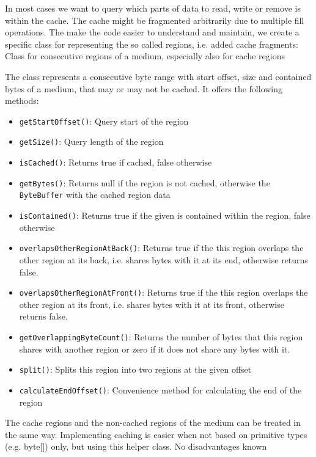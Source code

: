 In most cases we want to query which parts of data to read, write or remove is within the cache. The cache might be fragmented arbitrarily due to multiple fill operations. The make the code easier to understand and maintain, we create a specific class for representing the so called regions, i.e. added cache fragments:
{%
Class \MediumRegion{} for consecutive regions of a medium, especially also for cache regions
}
{%
The class \MediumRegion{} represents a consecutive byte range with start offset, size and contained bytes of a medium, that may or may not be cached. It offers the following methods:
\begin{itemize}
\item \texttt{getStartOffset()}: Query start \IMediumReference{} of the region
\item \texttt{getSize()}: Query length of the region
\item \texttt{isCached()}: Returns true if cached, false otherwise
\item \texttt{getBytes()}: Returns null if the region is not cached, otherwise the \texttt{ByteBuffer} with the cached region data
\item \texttt{isContained()}: Returns true if the given \IMediumReference{} is contained within the region, false otherwise
\item \texttt{overlapsOtherRegionAtBack()}: Returns true if the this region overlaps the other region at its back, i.e. shares bytes with it at its end, otherwise returns false.
\item \texttt{overlapsOtherRegionAtFront()}: Returns true if the this region overlaps the other region at its front, i.e. shares bytes with it at its front, otherwise returns false.
\item \texttt{getOverlappingByteCount()}: Returns the number of bytes that this region shares with another region or zero if it does not share any bytes with it.
\item \texttt{split()}: Splits this region into two regions at the given offset
\item \texttt{calculateEndOffset()}: Convenience method for calculating the end \IMediumReference{} of the region
\end{itemize}
}
{%
The cache regions and the non-cached regions of the medium can be treated in the same way. Implementing caching is easier when not based on primitive types (e.g. byte[]) only, but using this helper class.
}
{%
No disadvantages known
}

